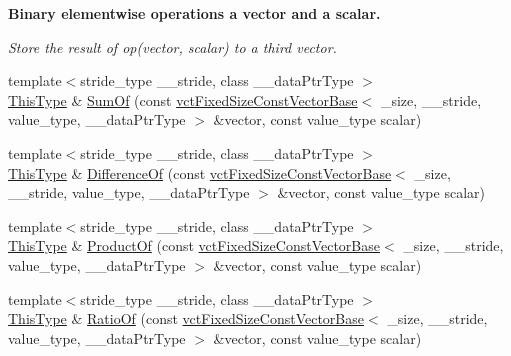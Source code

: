 \begin{Indent}{\bf Binary elementwise operations a vector and a scalar.}\par
{\em Store the result of op(vector, scalar) to a third vector. }\begin{DoxyCompactItemize}
\item 
{\footnotesize template$<$stride\-\_\-type \-\_\-\-\_\-stride, class \-\_\-\-\_\-data\-Ptr\-Type $>$ }\\\hyperlink{classvct_fixed_size_const_vector_base_a071063bc4fa43112cc287b2dbef53180}{This\-Type} \& \hyperlink{classvct_fixed_size_vector_base_a22b2c7baaf63523781a9b183a491691a}{Sum\-Of} (const \hyperlink{classvct_fixed_size_const_vector_base}{vct\-Fixed\-Size\-Const\-Vector\-Base}$<$ \-\_\-size, \-\_\-\-\_\-stride, value\-\_\-type, \-\_\-\-\_\-data\-Ptr\-Type $>$ \&vector, const value\-\_\-type scalar)
\item 
{\footnotesize template$<$stride\-\_\-type \-\_\-\-\_\-stride, class \-\_\-\-\_\-data\-Ptr\-Type $>$ }\\\hyperlink{classvct_fixed_size_const_vector_base_a071063bc4fa43112cc287b2dbef53180}{This\-Type} \& \hyperlink{classvct_fixed_size_vector_base_a5f62b082dbcc5215f3a104cc205bc6f4}{Difference\-Of} (const \hyperlink{classvct_fixed_size_const_vector_base}{vct\-Fixed\-Size\-Const\-Vector\-Base}$<$ \-\_\-size, \-\_\-\-\_\-stride, value\-\_\-type, \-\_\-\-\_\-data\-Ptr\-Type $>$ \&vector, const value\-\_\-type scalar)
\item 
{\footnotesize template$<$stride\-\_\-type \-\_\-\-\_\-stride, class \-\_\-\-\_\-data\-Ptr\-Type $>$ }\\\hyperlink{classvct_fixed_size_const_vector_base_a071063bc4fa43112cc287b2dbef53180}{This\-Type} \& \hyperlink{classvct_fixed_size_vector_base_ab7bb38831df41327f20741da7ad95273}{Product\-Of} (const \hyperlink{classvct_fixed_size_const_vector_base}{vct\-Fixed\-Size\-Const\-Vector\-Base}$<$ \-\_\-size, \-\_\-\-\_\-stride, value\-\_\-type, \-\_\-\-\_\-data\-Ptr\-Type $>$ \&vector, const value\-\_\-type scalar)
\item 
{\footnotesize template$<$stride\-\_\-type \-\_\-\-\_\-stride, class \-\_\-\-\_\-data\-Ptr\-Type $>$ }\\\hyperlink{classvct_fixed_size_const_vector_base_a071063bc4fa43112cc287b2dbef53180}{This\-Type} \& \hyperlink{classvct_fixed_size_vector_base_ad1531f0ded01b99b53053de3c6bc07f7}{Ratio\-Of} (const \hyperlink{classvct_fixed_size_const_vector_base}{vct\-Fixed\-Size\-Const\-Vector\-Base}$<$ \-\_\-size, \-\_\-\-\_\-stride, value\-\_\-type, \-\_\-\-\_\-data\-Ptr\-Type $>$ \&vector, const value\-\_\-type scalar)

\end{DoxyCompactItemize}
\end{Indent}
